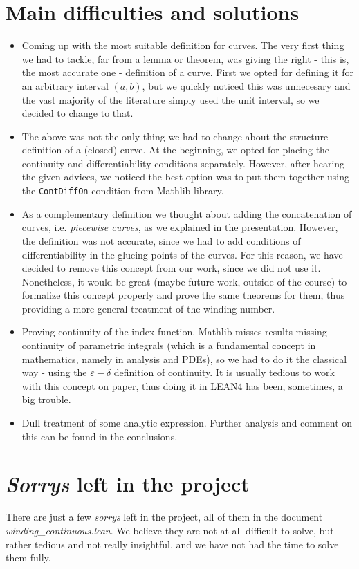 \documentclass[a4paper,12pt]{article}
\begin{document}
\section{Main difficulties and solutions}
\begin{itemize}
  \item Coming up with the most suitable definition for curves. The very first thing we had to tackle, far from a lemma or theorem, was giving the right - this is, the
  most accurate one - definition of a curve. First we opted for defining it for an arbitrary interval $(a, b)$,
  but we quickly noticed this was unnecesary and the vast majority of the literature simply used the unit interval,
  so we decided to change to that.
  \item The above was not the only thing we had to change about the structure definition of a (closed) curve. At the beginning, we opted
  for placing the continuity and differentiability conditions separately. However, after hearing the given advices, we noticed
  the best option was to put them together using the \verb|ContDiffOn| condition from Mathlib library.
  \item As a complementary definition we thought about adding the concatenation of curves, i.e.
  \textit{piecewise curves}, as we explained in the presentation. However, the definition was not
  accurate, since we had to add conditions of differentiability in the glueing points of the curves. For this
  reason, we have decided to remove this concept from our work, since we did not use it. Nonetheless, it would be great (maybe future work,
  outside of the course) to formalize this concept properly and prove the same theorems for them, thus providing a
  more general treatment of the winding number.
  \item Proving continuity of the index function. Mathlib misses results missing continuity of parametric
  integrals (which is a fundamental concept in mathematics, namely in analysis and PDEs), so we had to do it the classical
  way - using the $\varepsilon - \delta$ definition of continuity. It is usually tedious to work with this concept
  on paper, thus doing it in LEAN4 has been, sometimes, a big trouble.
  \item Dull treatment of some analytic expression. Further analysis and
  comment on this can be found in the conclusions.
\end{itemize}
\section{\textit{Sorrys} left in the project}
There are just a few \textit{sorrys} left in the project, all of them in the document \textit{winding\_continuous.lean}. We believe they are not at all difficult to solve, but rather tedious and not really insightful, and we have not had the time to solve them fully.
\end{document}
